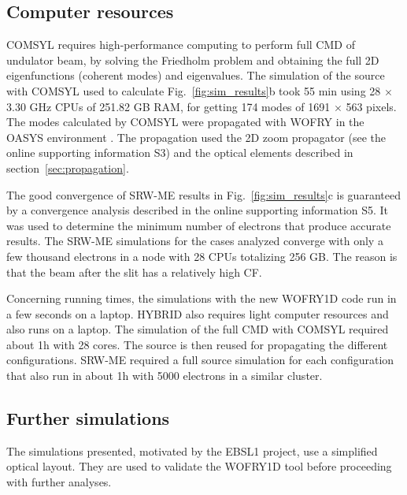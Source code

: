 \documentclass{iucr}
\newcommand{\inblue}[1]{{\color{blue}#1}}
\begin{document}
\subsection{Computer resources}

COMSYL requires high-performance computing to perform full CMD of undulator beam, by
solving the Friedholm problem and obtaining the full 2D eigenfunctions (coherent modes) and eigenvalues.
The simulation of the source with COMSYL used to calculate \inblue{Fig.~\ref{fig:sim_results}b} took 55 min using 28 $\times$ 3.30 GHz CPUs of 251.82 GB RAM, for getting 174 modes of 1691 $\times$ 563 pixels. The modes calculated by COMSYL were propagated with WOFRY in the OASYS environment \cite{codeOASYS}. The propagation used the 2D zoom propagator (see the online supporting information S3) and the optical elements described in section~\ref{sec:propagation}. 

The good convergence of SRW-ME results in \inblue{Fig.~\ref{fig:sim_results}c} is guaranteed by a convergence analysis described in the online supporting information S5. It was used to determine the minimum number of electrons that produce accurate results. The SRW-ME simulations for the cases analyzed converge with only a few thousand electrons
in a node with 28 CPUs totalizing 256 GB. The reason is that the beam after the slit has a relatively high CF. 

Concerning running times, the simulations with the new WOFRY1D code run in a few seconds on a laptop.
HYBRID also requires light computer resources and also runs on a laptop. 
The simulation of the full CMD with COMSYL required about 1h with 28 cores. The source is then reused for propagating the different configurations. SRW-ME required a full source simulation for each configuration that also run in about 1h with 5000 electrons in a similar cluster. 


\subsection{Further simulations}
\label{sec:discussion}

The simulations presented, motivated by the EBSL1 project, use a simplified optical layout. They are used to validate the WOFRY1D tool before proceeding with further analyses. 
\end{document}
